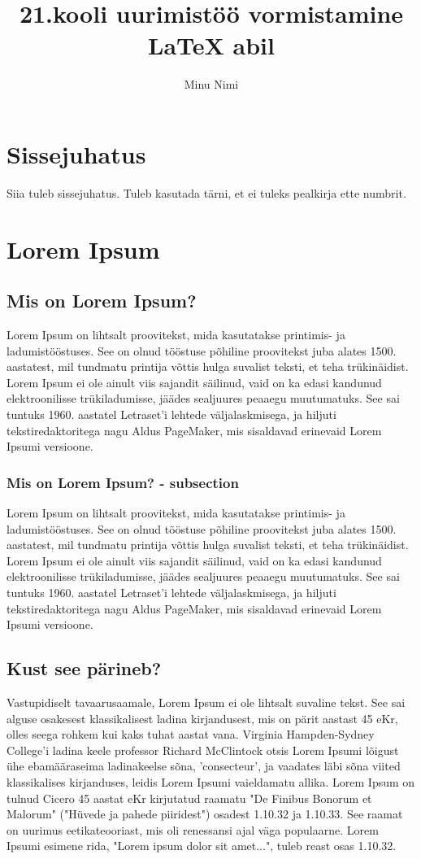 \documentclass{21kuur}
\title{21.kooli uurimistöö vormistamine LaTeX abil}
\author{Minu Nimi}
\begin{document}
\maketitle

\chapter*{Sissejuhatus}
Siia tuleb sissejuhatus. Tuleb kasutada tärni, et ei tuleks pealkirja ette numbrit. 


\chapter{Lorem Ipsum}

\section{Mis on Lorem Ipsum?}
Lorem Ipsum on lihtsalt proovitekst, mida kasutatakse printimis- ja ladumistööstuses. See on olnud tööstuse põhiline proovitekst juba alates 1500. aastatest, mil tundmatu printija võttis hulga suvalist teksti, et teha trükinäidist. Lorem Ipsum ei ole ainult viis sajandit säilinud, vaid on ka edasi kandunud elektroonilisse trükiladumisse, jäädes sealjuures peaaegu muutumatuks. See sai tuntuks 1960. aastatel Letraset'i lehtede väljalaskmisega, ja hiljuti tekstiredaktoritega nagu Aldus PageMaker, mis sisaldavad erinevaid Lorem Ipsumi versioone.

\subsection{Mis on Lorem Ipsum? - subsection}
Lorem Ipsum on lihtsalt proovitekst, mida kasutatakse printimis- ja ladumistööstuses. See on olnud tööstuse põhiline proovitekst juba alates 1500. aastatest, mil tundmatu printija võttis hulga suvalist teksti, et teha trükinäidist. Lorem Ipsum ei ole ainult viis sajandit säilinud, vaid on ka edasi kandunud elektroonilisse trükiladumisse, jäädes sealjuures peaaegu muutumatuks. See sai tuntuks 1960. aastatel Letraset'i lehtede väljalaskmisega, ja hiljuti tekstiredaktoritega nagu Aldus PageMaker, mis sisaldavad erinevaid Lorem Ipsumi versioone.

\section{Kust see pärineb?}
Vastupidiselt tavaarusaamale, Lorem Ipsum ei ole lihtsalt suvaline tekst. See sai alguse osakesest klassikalisest ladina kirjandusest, mis on pärit aastast 45 eKr, olles seega rohkem kui kaks tuhat aastat vana. Virginia Hampden-Sydney College'i ladina keele professor Richard McClintock otsis Lorem Ipsumi lõigust ühe ebamääraseima ladinakeelse sõna, 'consecteur', ja vaadates läbi sõna viited klassikalises kirjanduses, leidis Lorem Ipsumi vaieldamatu allika. Lorem Ipsum on tulnud Cicero 45 aastat eKr kirjutatud raamatu "De Finibus Bonorum et Malorum" ("Hüvede ja pahede piiridest") osadest 1.10.32 ja 1.10.33. See raamat on uurimus eetikateooriast, mis oli renessansi ajal väga populaarne. Lorem Ipsumi esimene rida, "Lorem ipsum dolor sit amet...", tuleb reast osas 1.10.32.
\end{document}
